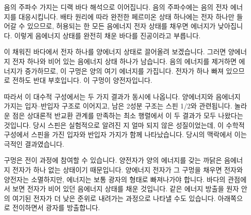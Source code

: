 음의 주파수 가지는 디랙 바다 해석으로 이어집니다. 음의 주파수에는 음의 전자 에너지를 대응시킵니다. 배타 원리에 따라 완전한 페르미온 상태 하나에는 전자 하나만 들어갈 수 있으므로, 허용되는 한 모든 음에너지 전자 상태를 채우면 에너지가 낮아집니다. 이렇게 음에너지 상태를 완전히 채운 바다를 진공이라고 부릅니다.

이 채워진 바다에서 전자 하나를 양에너지 상태로 끌어올려 보겠습니다. 그러면 양에너지 전자 하나와 비어 있는 음에너지 상태 하나가 남습니다. 음의 에너지를 제거하면 에너지가 증가하므로, 이 구멍은 양의 여기 에너지를 가집니다. 전자가 하나 빠져 있으므로 전하도 반대 부호입니다. 이 구멍이 양전자입니다.

\begin{classroomqa}
\end{classroomqa}

따라서 이 대수적 구성에서는 두 가지 결과가 동시에 나옵니다. 양에너지와 음에너지 가지는 입자--반입자 구조로 이어지고, 남은 2성분 구조는 스핀 1/2와 관련됩니다. 놀라운 점은 상대론적 반교환 관계를 만족하는 최소 행렬에서 이 두 결과가 모두 나왔다는 것입니다. 당시 스핀은 실험적으로 알려진 지 얼마 되지 않은 성질이었는데, 이 수학적 구성에서 스핀을 가진 입자와 반입자 가지가 함께 나타났습니다. 당시의 맥락에서 이는 극적인 결과였습니다.

\begin{classroomqa}
\end{classroomqa}

구멍은 전이 과정에 참여할 수 있습니다. 양전자가 양의 에너지를 갖는 까닭은 음에너지 전자가 하나 없는 상태이기 때문입니다. 양에너지 전자가 그 구멍을 채우면 전자와 양전자는 소멸하지만, 에너지는 보통 광자의 형태로 빠져나가야 합니다. 바다의 관점에서 보면 전자가 비어 있던 음에너지 상태를 채운 것입니다. 같은 에너지 방출을 원자 안의 여기된 전자가 더 낮은 준위로 내려가는 과정으로 나타낼 수도 있습니다. 아래쪽으로 전이하면서 광자를 방출합니다.

